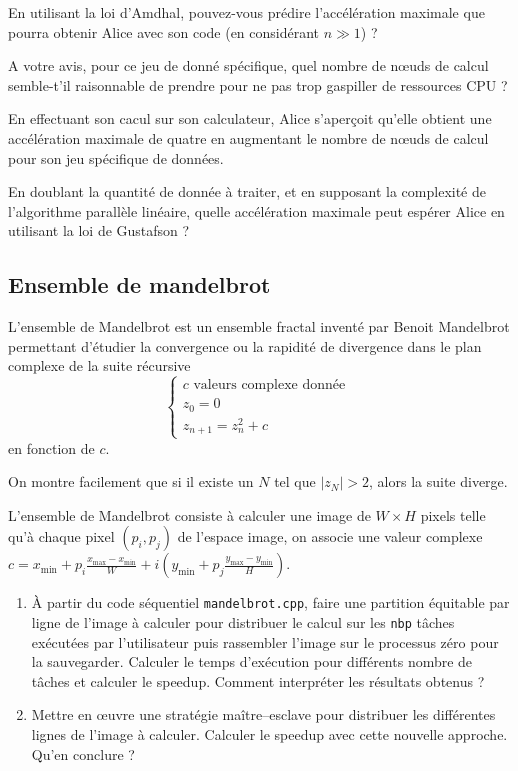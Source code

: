 \documentclass[11pt,a4paper]{article}
\begin{document}
En utilisant la loi d'Amdhal, pouvez-vous prédire l'accélération maximale que pourra obtenir Alice
avec son code (en considérant $n\gg 1$) ? 

A votre avis, pour ce jeu de donné spécifique, quel nombre de n{\oe}uds de calcul semble-t'il
raisonnable de prendre pour ne pas trop gaspiller de ressources CPU ?

En effectuant son cacul sur son calculateur, Alice s'aperçoit qu'elle obtient une accélération
maximale de quatre en augmentant le nombre de n{\oe}uds de calcul pour son jeu spécifique de données.

En doublant la quantité de donnée à traiter, et en supposant la complexité de l'algorithme parallèle
linéaire, quelle accélération maximale peut espérer Alice en
utilisant la loi de Gustafson ?

\subsection{Ensemble de mandelbrot}

L'ensemble de Mandelbrot est un ensemble fractal inventé par Benoit Mandelbrot permettant d'étudier  la convergence ou la rapidité de divergence dans le plan complexe de la suite récursive 
$$
\left\{\begin{array}{l}
c \mbox{ valeurs complexe donnée } \\
z_{0} = 0\\
z_{n+1} = z_{n}^{2} + c
\end{array}\right.
$$
en fonction de $c$.

On montre facilement que si il existe un $N$ tel que $|z_{N}| > 2$, alors la suite diverge. 

L'ensemble de Mandelbrot consiste à calculer une image de $W \times H$ pixels telle qu'à chaque pixel $\left(p_{i},p_{j}\right)$ de l'espace image, on associe une valeur complexe
$c = x_{\min}+p_{i} \frac{x_{\max}-x_{\min}}{W} +  i \left (y_{\min}+p_{j} \frac{y_{\max}-y_{\min}}{H}\right)$.

\begin{enumerate}
\item À partir du code séquentiel \texttt{mandelbrot.cpp}, faire une partition équitable par ligne de l'image à calculer pour distribuer le calcul sur les \texttt{nbp} tâches exécutées par l'utilisateur puis rassembler l'image sur le processus zéro pour la sauvegarder. Calculer le temps d'exécution pour différents nombre de tâches et calculer le speedup. Comment interpréter les résultats obtenus ?
\item Mettre en {\oe}uvre une stratégie maître--esclave pour distribuer les différentes lignes de l'image à calculer. Calculer le speedup avec cette nouvelle approche. Qu'en conclure ?
\end{enumerate}
\end{document}

